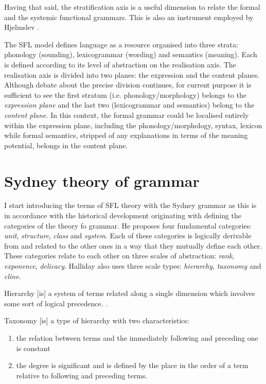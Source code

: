 Having that said, the stratification axis is a useful dimension to relate the formal and the systemic functional grammars. This is also an instrument employed by Hjelmslev \citep{Taverniers2011}. %

The SFL model defines language as a resource organised into three strata: phonology (sounding), lexicogrammar (wording) and semantics (meaning). Each is defined according to its level of abstraction on the realisation axis. The realisation axis is divided into two planes: the expression and the content planes. 
Although debate about the precise division continues, for current purpose it is sufficient to see the first stratum (i.e. phonology/morphology) belongs to the \textit{expression plane} and the last two (lexicogrammar and semantics) belong to the \textit{content plane}.
In this context, the formal grammar could be localised entirely within the expression plane, including the phonology/morphology, syntax, lexicon while formal semantics, stripped of any explanations in terms of the meaning potential, belongs in the content plane.

\section{Sydney theory of grammar}
\label{sec:sydney-theory-of-grammar}
I start introducing the terms of SFL theory with the Sydney grammar as this is in accordance with the historical development originating with \citet{Halliday2002} defining the categories of the theory fo grammar. He proposes four fundamental categories: \textit{unit}, \textit{structure}, \textit{class} and \textit{system}. Each of these categories is logically derivable from and related to the other ones in a way that they mutually define each other. These categories relate to each other on three scales of abstraction: \textit{rank}, \textit{exponence}, \textit{delicacy}. Halliday also uses three scale types: \textit{hierarchy}, \textit{taxonomy} and \textit{cline}.

\begin{definition}[Hierarchy]\label{def:hierarchy}
	Hierarchy [is] a system of terms related along a single dimension which involves some sort of logical precedence. 
	\citep[42]{Halliday2002}. 
\end{definition}

\begin{definition}[Taxonomy]\label{def:taxonomy}
	Taxonomy [is] a type of hierarchy with two characteristics:
	\begin{enumerate}
		\item the relation between terms and the immediately following and preceding one is constant
		\item the degree is significant and is defined by the place in the order of a term relative to following and preceding terms. \citep[42]{Halliday2002}
	\end{enumerate}
\end{definition} 

